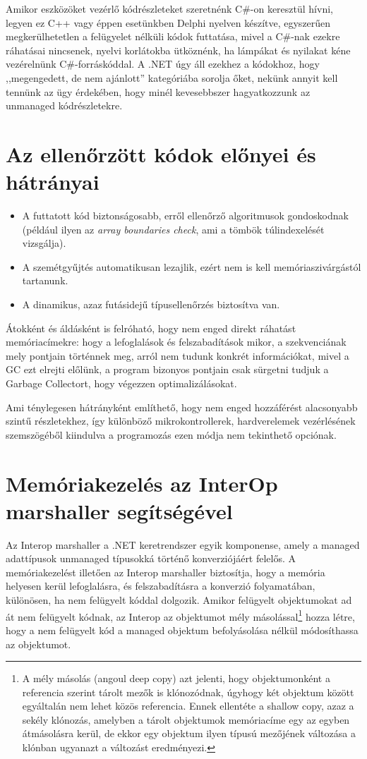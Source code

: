 \documentclass[tocnopagenum]{thesis-ekf}
\theoremstyle{definition}
\theoremstyle{remark}
\begin{document}
	Amikor eszközöket vezérlő kódrészleteket szeretnénk C\#-on keresztül hívni, legyen ez C++ vagy éppen esetünkben Delphi nyelven készítve, egyszerűen megkerülhetetlen a felügyelet nélküli kódok futtatása, mivel a C\#-nak ezekre ráhatásai nincsenek, nyelvi korlátokba ütköznénk, ha lámpákat és nyilakat kéne vezérelnünk C\#-forráskóddal. A .NET úgy áll ezekhez a kódokhoz, hogy ,,megengedett, de nem ajánlott'' kategóriába sorolja őket, nekünk annyit kell tennünk az ügy érdekében, hogy minél kevesebbszer hagyatkozzunk az unmanaged kódrészletekre.
	\section{Az ellenőrzött kódok előnyei és hátrányai}
	\begin{itemize}
		\item A futtatott kód biztonságosabb, erről ellenőrző algoritmusok gondoskodnak (például ilyen az \textit{array boundaries check}, ami a tömbök túlindexelését vizsgálja).
		\item A szemétgyűjtés automatikusan lezajlik, ezért nem is kell memóriaszivárgástól tartanunk.
		\item A dinamikus, azaz futásidejű típusellenőrzés biztosítva van.
	\end{itemize}
	
	Átokként és áldásként is felróható, hogy nem enged direkt ráhatást memóriacímekre: hogy a lefoglalások és felszabadítások mikor, a szekvenciának mely pontjain történnek meg, arról nem tudunk konkrét információkat, mivel a GC ezt elrejti előlünk, a program bizonyos pontjain csak sürgetni tudjuk a Garbage Collectort, hogy végezzen optimalizálásokat. 
	
	Ami ténylegesen hátrányként említhető, hogy nem enged hozzáférést alacsonyabb szintű részletekhez, így különböző mikrokontrollerek, hardverelemek vezérlésének szemszögéből kiindulva a programozás ezen módja nem tekinthető opciónak.
	\section{Memóriakezelés az InterOp marshaller segítségével}
	Az Interop marshaller a .NET keretrendszer egyik komponense, amely a managed adattípusok unmanaged típusokká történő konverziójáért felelős. A memóriakezelést illetően az Interop marshaller biztosítja, hogy a memória helyesen kerül lefoglalásra, és felszabadításra a konverzió folyamatában, különösen, ha nem felügyelt kóddal dolgozik.
	Amikor felügyelt objektumokat ad át nem felügyelt kódnak, az Interop az objektumot mély másolással\footnote{A mély másolás (angoul deep copy) azt jelenti, hogy objektumonként a referencia szerint tárolt mezők is klónozódnak, úgyhogy két objektum között egyáltalán nem lehet közös referencia. Ennek ellentéte a shallow copy, azaz a sekély klónozás, amelyben a tárolt objektumok memóriacíme egy az egyben átmásolásra kerül, de ekkor egy objektum ilyen típusú mezőjének változása a klónban ugyanazt a változást eredményezi.} hozza létre, hogy a nem felügyelt kód a managed objektum befolyásolása nélkül módosíthassa az objektumot. 
	
\end{document}
